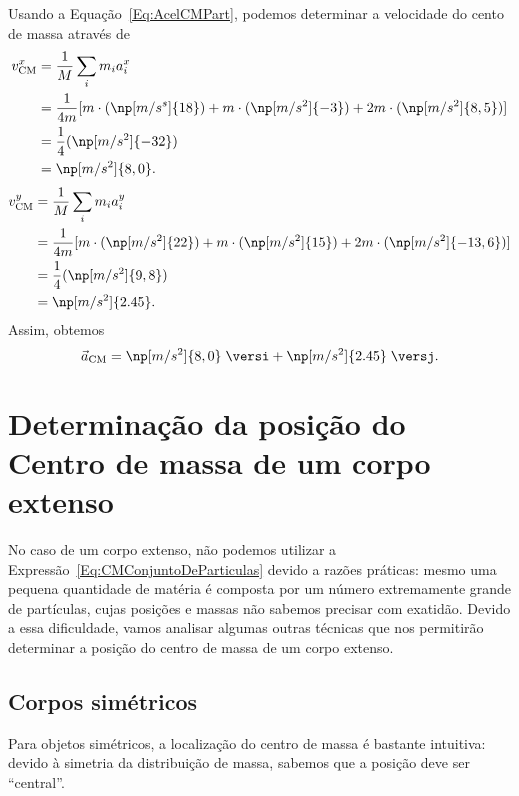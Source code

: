 Usando a Equação~\ref{Eq:AcelCMPart}, podemos determinar a velocidade do cento de massa através de
\begin{align}
    v^x_{\rm{CM}} &= \frac{1}{M} \sum_{i} m_i a^x_i \\
    &= \frac{1}{4m} [m\cdot(\np[m/s^s]{18}) + m\cdot(\np[m/s^2]{-3}) + 2m\cdot(\np[m/s^2]{8,5})] \\
    &= \frac{1}{4} (\np[m/s^2]{-32}) \\
    &= \np[m/s^2]{8,0}.
\end{align}
%
\begin{align}
    v^y_{\rm{CM}} &= \frac{1}{M} \sum_{i} m_i a^y_i \\
    &= \frac{1}{4m} [m\cdot(\np[m/s^2]{22}) + m\cdot(\np[m/s^2]{15}) + 2m\cdot(\np[m/s^2]{-13,6})] \\
    &= \frac{1}{4} (\np[m/s^2]{9,8}) \\
    &= \np[m/s^2]{2.45}.
\end{align}
%
Assim, obtemos
\begin{equation}
    \vec{a}_{\text{CM}} = \np[m/s^2]{8,0} \; \versi + \np[m/s^2]{2.45} \;\versj.
\end{equation}

\section{Determinação da posição do Centro de massa de um corpo extenso}

No caso de um corpo extenso, não podemos utilizar a Expressão~\eqref{Eq:CMConjuntoDeParticulas} devido a razões práticas: mesmo uma pequena quantidade de matéria é composta por um número extremamente grande de partículas, cujas posições e massas não sabemos precisar com exatidão. Devido a essa dificuldade, vamos analisar algumas outras técnicas que nos permitirão determinar a posição do centro de massa de um corpo extenso.

\subsection{Corpos simétricos}

\begin{marginfigure}
\centering
{}
\caption{Para objetos simétricos, a localização do centro de massa é bastante intuitiva: devido à simetria da distribuição de massa, sabemos que a posição deve ser ``central''. \label{Fig:CMFigurasSimetricas}}
\end{marginfigure}

